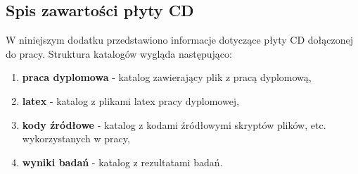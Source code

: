\begin{appendices}
	\chapter{Spis zawartości płyty CD}
	W niniejszym dodatku przedstawiono informacje dotyczące płyty CD dołączonej do pracy.
 	Struktura katalogów wygląda następująco:
	\begin{enumerate}
		\item \textbf{praca dyplomowa} - katalog zawierający plik z pracą dyplomową,
		\item \textbf{latex} - katalog z plikami latex pracy dyplomowej,
		\item \textbf{kody źródłowe} - katalog z kodami źródłowymi skryptów plików, etc. wykorzystanych w pracy,
		\item \textbf{wyniki badań} - katalog z rezultatami badań.
	\end{enumerate}
\end{appendices}
